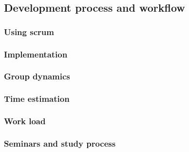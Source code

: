 \subsection{Development process and workflow}
	\subsubsection{Using scrum}
	\subsubsection{Implementation}
	\subsubsection{Group dynamics}
	\subsubsection{Time estimation}
	\subsubsection{Work load}
	\subsubsection{Seminars and study process}


